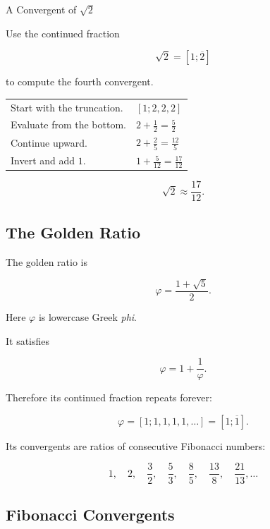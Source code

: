 \begin{workedexamplebox}{A Convergent of \(\sqrt2\)}

Use the continued fraction

\[ \sqrt2=[1;\overline2] \]

to compute the fourth convergent.

\begin{tabularx}{\textwidth}{@{}>{\raggedright\arraybackslash}p{}X@{}}
Start with the truncation. & \([1;2,2,2]\)\\
Evaluate from the bottom. & \(2+\frac12=\frac52\)\\
Continue upward. & \(2+\frac{2}{5}=\frac{12}{5}\)\\
Invert and add \(1\). & \(1+\frac5{12}=\frac{17}{12}\)
\end{tabularx}

\begin{answerbox}
\[ \boxed{\sqrt2\approx\frac{17}{12}.} \]
\end{answerbox}
\end{workedexamplebox}

\subsection{The Golden Ratio}
\label{subsec:golden-ratio-diophantine}

The golden ratio is

\[ \varphi=\frac{1+\sqrt5}{2}. \]

Here \(\varphi\) is lowercase Greek \emph{phi}.

It satisfies

\[ \varphi=1+\frac1\varphi. \]

Therefore its continued fraction repeats forever:

\[ \boxed{\varphi=[1;1,1,1,1,\ldots]=[1;\overline1].} \]

Its convergents are ratios of consecutive Fibonacci numbers:

\[
1,\quad
2,\quad
\frac32,\quad
\frac53,\quad
\frac85,\quad
\frac{13}{8},\quad
\frac{21}{13},\ldots
\]

\subsection{Fibonacci Convergents}
\label{subsec:fibonacci-golden-convergents}

